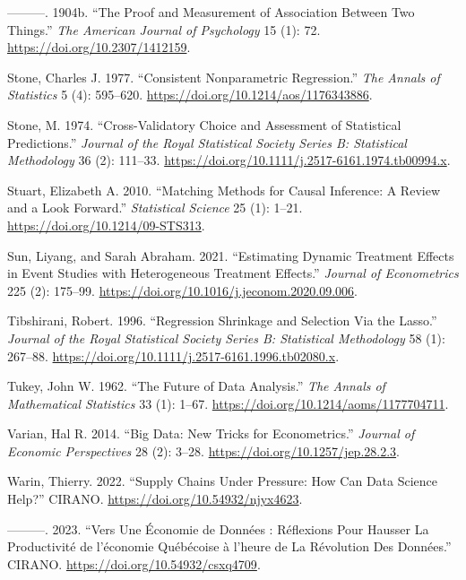 \documentclass[
  letterpaper,
  10pt,
  twoside,
  openright,
  numbers=noenddot,
  chapterprefix=true]{scrbook}
\newlength{\cslhangindent}
\newenvironment{CSLReferences}[2] %
 {\begin{list}{}{%
  \setlength{\itemindent}{0pt}
  \setlength{\leftmargin}{0pt}
  \setlength{\parsep}{0pt}
  \ifodd #1
   \setlength{\leftmargin}{\cslhangindent}
   \setlength{\itemindent}{-1\cslhangindent}
  \fi
  \setlength{\itemsep}{#2\baselineskip}}}
 {\end{list}}
\begin{document}
\begin{CSLReferences}{1}{0}
---------. 1904b. {``{The} {Proof} and {Measurement} of {Association}
Between {Two} {Things}.''} \emph{{The} {American} {Journal} of
{Psychology}} 15 (1): 72. \url{https://doi.org/10.2307/1412159}.

Stone, Charles J. 1977. {``{Consistent} {Nonparametric} {Regression}.''}
\emph{{The} {Annals} of {Statistics}} 5 (4): 595--620.
\url{https://doi.org/10.1214/aos/1176343886}.

Stone, M. 1974. {``{Cross}-{Validatory} {Choice} and {Assessment} of
{Statistical} {Predictions}.''} \emph{{Journal} of the {Royal}
{Statistical} {Society} {Series} B: {Statistical} {Methodology}} 36 (2):
111--33. \url{https://doi.org/10.1111/j.2517-6161.1974.tb00994.x}.

Stuart, Elizabeth A. 2010. {``{Matching} {Methods} for {Causal}
{Inference}: A {Review} and a {Look} {Forward}.''} \emph{{Statistical}
{Science}} 25 (1): 1--21. \url{https://doi.org/10.1214/09-STS313}.

Sun, Liyang, and Sarah Abraham. 2021. {``{Estimating} Dynamic Treatment
Effects in Event Studies with Heterogeneous Treatment Effects.''}
\emph{{Journal} of {Econometrics}} 225 (2): 175--99.
\url{https://doi.org/10.1016/j.jeconom.2020.09.006}.

Tibshirani, Robert. 1996. {``{Regression} {Shrinkage} and {Selection}
{Via} the {Lasso}.''} \emph{{Journal} of the {Royal} {Statistical}
{Society} {Series} B: {Statistical} {Methodology}} 58 (1): 267--88.
\url{https://doi.org/10.1111/j.2517-6161.1996.tb02080.x}.

Tukey, John W. 1962. {``{The} {Future} of {Data} {Analysis}.''}
\emph{{The} {Annals} of {Mathematical} {Statistics}} 33 (1): 1--67.
\url{https://doi.org/10.1214/aoms/1177704711}.

Varian, Hal R. 2014. {``{Big} {Data}: {New} {Tricks} for
{Econometrics}.''} \emph{{Journal} of {Economic} {Perspectives}} 28 (2):
3--28. \url{https://doi.org/10.1257/jep.28.2.3}.

Warin, Thierry. 2022. {``{Supply} Chains Under Pressure: {How} Can Data
Science Help?''} {CIRANO}. \url{https://doi.org/10.54932/njyx4623}.

---------. 2023. {``{Vers} Une Économie de Données : Réflexions Pour
Hausser La Productivité de l'économie Québécoise à l'heure de La
Révolution Des Données.''} {CIRANO}.
\url{https://doi.org/10.54932/csxq4709}.


\end{CSLReferences}
\end{document}
